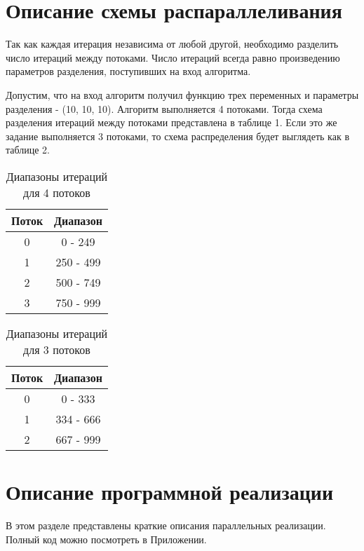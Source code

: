 \documentclass{report}
\begin{document}
    \section*{Описание схемы распараллеливания}
    \par Так как каждая итерация независима от любой другой, необходимо разделить число итераций между потоками. Число итераций всегда равно произведению параметров разделения, поступивших на вход алгоритма.
    \par Допустим, что на вход алгоритм получил функцию трех переменных и параметры разделения - (10, 10, 10). Алгоритм выполняется 4 потоками. Тогда схема разделения итераций между потоками представлена в таблице 1. Если это же задание выполняется 3 потоками, то схема распределения будет выглядеть как в таблице 2.
    \begin{table}[htbp]
        \centering
        \begin{tabular}{|c|c|}
            \hline
            Поток & Диапазон  \\ \hline
            0     & 0 - 249   \\ \hline
            1     & 250 - 499 \\ \hline
            2     & 500 - 749 \\ \hline
            3     & 750 - 999 \\ \hline
        \end{tabular}
        \caption{Диапазоны итераций для 4 потоков}
        \label{tab:example}
    \end{table}
    \begin{table}[htbp]
        \centering
        \begin{tabular}{|c|c|}
            \hline
            Поток & Диапазон  \\ \hline
            0     & 0 - 333   \\ \hline
            1     & 334 - 666 \\ \hline
            2     & 667 - 999 \\ \hline
        \end{tabular}
        \caption{Диапазоны итераций для 3 потоков}
        \label{tab:example}
    \end{table}
    \newpage
    
    \section*{Описание программной реализации}
    \par В этом разделе представлены краткие описания параллельных реализации. Полный код можно посмотреть в Приложении.
    
\end{document}
